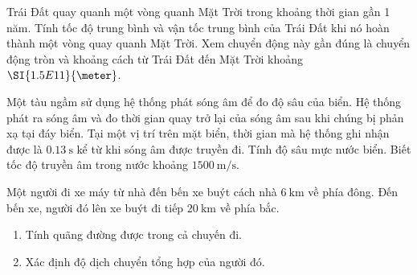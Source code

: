 \begin{ex}
	Trái Đất quay quanh một vòng quanh Mặt Trời trong khoảng thời gian gần 1 năm. Tính tốc độ trung bình và vận tốc trung bình của Trái Đất khi nó hoàn thành một vòng quay quanh Mặt Trời. Xem chuyển động này gần đúng là chuyển động tròn và khoảng cách từ Trái Đất đến Mặt Trời khoảng $\SI{1.5E11}{\meter}$.
	
\end{ex}

\begin{ex}
	Một tàu ngầm sử dụng hệ thống phát sóng âm để đo độ sâu của biển. Hệ thống phát ra sóng âm và đo thời gian quay trở lại của sóng âm sau khi chúng bị phản xạ tại đáy biển. Tại một vị trí trên mặt biển, thời gian mà hệ thống ghi nhận được là $\SI{0.13}{\second}$ kể từ khi sóng âm được truyền đi. Tính độ sâu mực nước biển. Biết tốc độ truyền âm trong nước khoảng $\SI{1500}{\meter/\second}$.
	
\end{ex}

\begin{ex}
	Một người đi xe máy từ nhà đến bến xe buýt cách nhà $\SI{6}{\kilo\meter}$ về phía đông. Đến bến xe, người đó lên xe buýt đi tiếp $\SI{20}{\kilo\meter}$ về phía bắc.
	\begin{enumerate}[label=\alph*)]
		\item Tính quãng đường được trong cả chuyến đi.
		\item Xác định độ dịch chuyển tổng hợp của người đó.
	\end{enumerate}
\end{ex}


